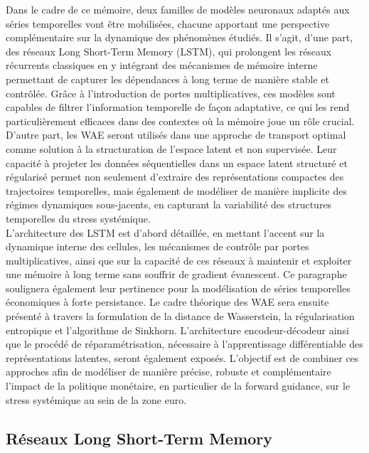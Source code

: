 Dans le cadre de ce mémoire, deux familles de modèles neuronaux adaptés aux séries temporelles vont être mobilisées, chacune apportant une perspective complémentaire sur la dynamique des phénomènes étudiés. Il s’agit, d’une part, des réseaux Long Short-Term Memory (LSTM), qui prolongent les réseaux récurrents classiques en y intégrant des mécanismes de mémoire interne permettant de capturer les dépendances à long terme de manière stable et contrôlée. Grâce à l’introduction de portes multiplicatives, ces modèles sont capables de filtrer l’information temporelle de façon adaptative, ce qui les rend particulièrement efficaces dans des contextes où la mémoire joue un rôle crucial. D’autre part, les WAE seront utilisés dans une approche de transport optimal comme solution à la structuration de l'espace latent et non supervisée. Leur capacité à projeter les données séquentielles dans un espace latent structuré et régularisé permet non seulement d’extraire des représentations compactes des trajectoires temporelles, mais également de modéliser de manière implicite des régimes dynamiques sous-jacents, en capturant la variabilité des structures temporelles du stress systémique.\\

L’architecture des LSTM est d'abord détaillée, en mettant l’accent sur la dynamique interne des cellules, les mécanismes de contrôle par portes multiplicatives, ainsi que sur la capacité de ces réseaux à maintenir et exploiter une mémoire à long terme sans souffrir de gradient évanescent. Ce paragraphe soulignera également leur pertinence pour la modélisation de séries temporelles économiques à forte persistance. Le cadre théorique des WAE sera ensuite présenté à travers la formulation de la distance de Wasserstein, la régularisation entropique et l'algorithme de Sinkhorn. L’architecture encodeur-décodeur ainsi que le procédé de réparamétrisation, nécessaire à l’apprentissage différentiable des représentations latentes, seront également exposés. L’objectif est de combiner ces approches afin de modéliser de manière précise, robuste et complémentaire l’impact de la politique monétaire, en particulier de la forward guidance, sur le stress systémique au sein de la zone euro.

\subsection{Réseaux Long Short-Term Memory}


